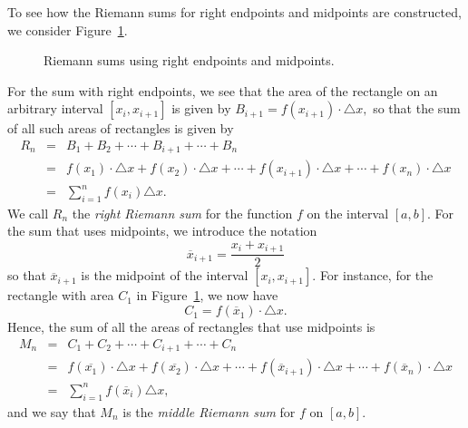 To see how the Riemann sums for right endpoints and midpoints are constructed, we consider Figure~\ref{F:4.2.RightMidSum}.
\begin{figure}[h]
\begin{center}
\caption{Riemann sums using right endpoints and midpoints.} \label{F:4.2.RightMidSum}
\end{center}
\end{figure}
For the sum with right endpoints, we see that the area of the rectangle on an arbitrary interval $[x_i, x_{i+1}]$ is given by $B_{i+1} = f(x_{i+1}) \cdot \triangle x,$
so that the sum of all such areas of rectangles is given by
\begin{eqnarray*}
R_n & = & B_1 + B_2 + \cdots + B_{i+1} + \cdots + B_n \\
	& = &  f(x_1) \cdot \triangle x + f(x_2) \cdot \triangle x + \cdots + f(x_{i+1}) \cdot \triangle x + \cdots + f(x_{n}) \cdot \triangle x \\ 
	& = & \sum_{i=1}^{n} f(x_i) \triangle x.
\end{eqnarray*}
We call $R_n$ the \emph{right Riemann sum}  for the function $f$ on the interval $[a,b]$.  For the sum that uses midpoints, we introduce the notation
$$\overline{x}_{i+1} = \frac{x_{i} + x_{i+1}}{2}$$
so that $\overline{x}_{i+1}$ is the midpoint of the interval $[x_i, x_{i+1}]$.  For instance, for the rectangle with area $C_1$ in Figure~\ref{F:4.2.RightMidSum}, we now have
$$C_1 = f(\overline{x}_1) \cdot \triangle x.$$
Hence, the sum of all the areas of rectangles that use midpoints is 
\begin{eqnarray*}
M_n & = & C_1 + C_2 + \cdots + C_{i+1} + \cdots + C_n \\
	& = &  f(\overline{x_1}) \cdot \triangle x + f(\overline{x_2}) \cdot \triangle x + \cdots + f(\overline{x}_{i+1}) \cdot \triangle x + \cdots + f(\overline{x}_{n}) \cdot \triangle x \\ 
	& = & \sum_{i=1}^{n} f(\overline{x}_i) \triangle x,
\end{eqnarray*}
and we say that $M_n$ is the \emph{middle Riemann sum}  for $f$ on $[a,b]$.

